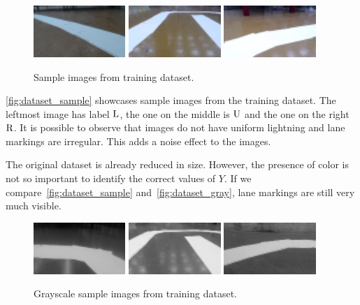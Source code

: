 \begin{figure}[h]
  \centering\includegraphics[width=0.31\textwidth]{imgs/sample_left.png}
  \includegraphics[width=0.31\textwidth]{imgs/sample_up.png}
  \includegraphics[width=0.31\textwidth]{imgs/sample_right.png}
  \caption{Sample images from training dataset.\label{fig:dataset_sample}}
\end{figure}

\autoref{fig:dataset_sample} showcases sample images from the training dataset. The leftmost image
has label $\text{L}$, the one on the middle is $\text{U}$ and the one on the right $\text{R}$. It is possible
to observe that images do not have uniform lightning and lane markings are irregular. This adds a
noise effect to the images.

The original dataset is already reduced in size. However, the presence of color is not so important
to identify the correct values of $Y$. If we compare~\autoref{fig:dataset_sample}
and~\autoref{fig:dataset_gray}, lane markings are still very much visible.

\begin{figure}[h]
  \centering\includegraphics[width=0.31\textwidth]{imgs/gray_left.png}
  \includegraphics[width=0.31\textwidth]{imgs/gray_up.png}
  \includegraphics[width=0.31\textwidth]{imgs/gray_right.png}
  \caption{Grayscale sample images from training dataset.\label{fig:dataset_gray}}
\end{figure}

